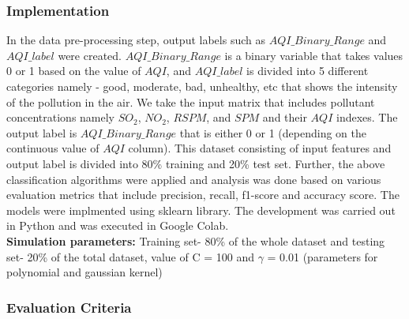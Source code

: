 \documentclass{article}
\begin{document}
\subsubsection  {\color{brown} \textbf{Implementation}} 
In the data pre-processing step, output labels such as $AQI\_Binary\_Range$ and $AQI\_label$ were created. $AQI\_Binary\_Range$ is a binary variable that takes values 0 or 1 based on the value of $AQI$, and $AQI\_label$ is divided into 5 different categories namely - good, moderate, bad, unhealthy, etc that shows the intensity of the pollution in the air. We take the input matrix that includes pollutant concentrations namely $SO_2$, $NO_2$, $RSPM$, and $SPM$ and their $AQI$ indexes. The output label is $AQI\_Binary\_Range$ that is either 0 or 1 (depending on the continuous value of $AQI$ column). This dataset consisting of input features and output label is divided into 80\% training and 20\% test set. Further, the above classification algorithms were applied and analysis was done based on various evaluation metrics that include precision, recall, f1-score and accuracy score. The models were implmented using sklearn library. The development was carried out in Python and was executed in Google Colab. \\
\textbf{Simulation parameters:} Training set- 80\% of the whole dataset and testing set- 20\% of the total dataset, value of C = 100 and $\gamma$ = 0.01 (parameters for polynomial and gaussian kernel) \\

\subsubsection  {\color{brown} \textbf{Evaluation Criteria} }
\end{document}
